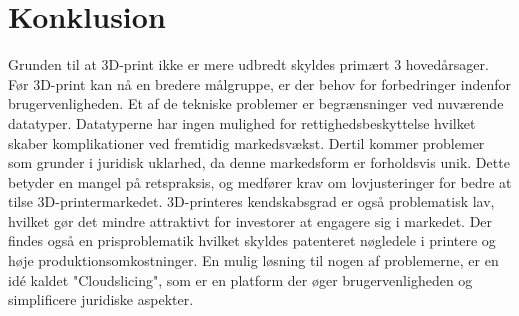 	\chapter{Konklusion}
Grunden til at 3D-print ikke er mere udbredt skyldes primært 3 hovedårsager. Før 3D-print kan nå en bredere målgruppe, er der behov for forbedringer indenfor brugervenligheden. Et af de tekniske problemer er begrænsninger ved nuværende datatyper. Datatyperne har ingen mulighed for rettighedsbeskyttelse hvilket skaber komplikationer ved fremtidig markedsvækst. 
Dertil kommer problemer som grunder i juridisk uklarhed, da denne markedsform er forholdsvis unik. Dette betyder en mangel på retspraksis, og medfører krav om lovjusteringer for bedre at tilse 3D-printermarkedet.
3D-printeres kendskabsgrad er også problematisk lav, hvilket gør det mindre attraktivt for investorer at engagere sig i markedet. Der findes også en prisproblematik hvilket skyldes patenteret nøgledele i printere og høje produktionsomkostninger. 
En mulig løsning til nogen af problemerne, er en idé kaldet "Cloudslicing", som er en platform der øger brugervenligheden og simplificere juridiske aspekter.
